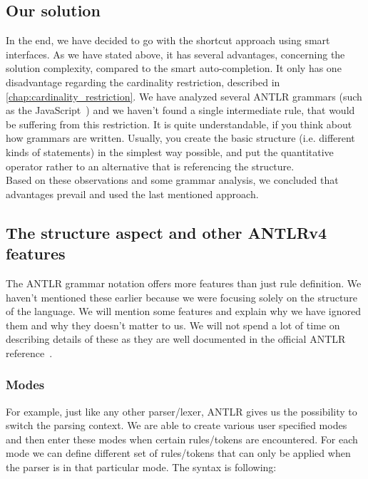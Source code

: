 \pagebreak



\pagebreak

\subsection{Our solution}
\label{chap:structure_solution}

In the end, we have decided to go with the shortcut approach using smart interfaces.
As we have stated above, it has several advantages, concerning the solution complexity, compared to the smart auto-completion.
It only has one disadvantage regarding the cardinality restriction, described in \ref{chap:cardinality_restriction}.
We have analyzed several ANTLR grammars (such as the JavaScript~\cite{javascript}) and we haven't found a single intermediate rule, that would be suffering from this restriction.
It is quite understandable, if you think about how grammars are written.
Usually, you create the basic structure (i.e. different kinds of statements) in the simplest way possible, and put the quantitative operator rather to an alternative that is referencing the structure.
\\

Based on these observations and some grammar analysis, we concluded that advantages prevail and used the last mentioned approach.

\subsection{The structure aspect and other ANTLRv4 features}

The ANTLR grammar notation offers more features than just rule definition.
We haven't mentioned these earlier because we were focusing solely on the structure of the language.
We will mention some features and explain why we have ignored them and why they doesn't matter to us.
We will not spend a lot of time on describing details of these as they are well documented in the official ANTLR reference~\cite{ANTLR4reference}.

\subsubsection{Modes}

For example, just like any other parser/lexer, ANTLR gives us the possibility to switch the parsing context.
We are able to create various user specified modes and then enter these modes when certain rules/tokens are encountered.
For each mode we can define different set of rules/tokens that can only be applied when the parser is in that particular mode.
The syntax is following:

